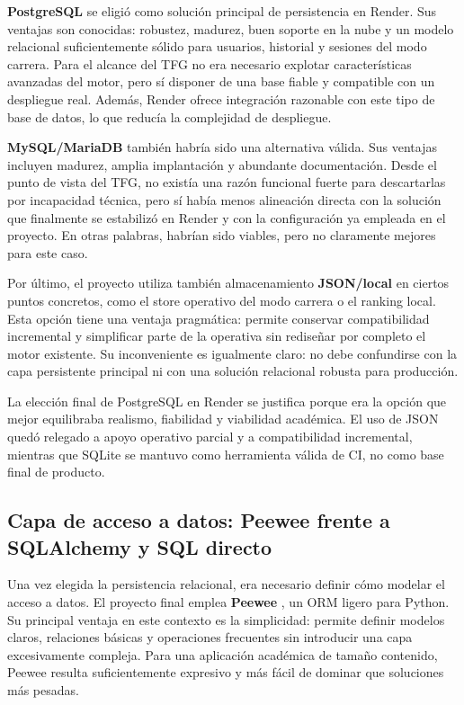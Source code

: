 \textbf{PostgreSQL} \cite{postgresql} se eligió como solución principal de persistencia en Render. Sus ventajas son conocidas: robustez, madurez, buen soporte en la nube y un modelo relacional suficientemente sólido para usuarios, historial y sesiones del modo carrera. Para el alcance del TFG no era necesario explotar características avanzadas del motor, pero sí disponer de una base fiable y compatible con un despliegue real. Además, Render ofrece integración razonable con este tipo de base de datos, lo que reducía la complejidad de despliegue.

\textbf{MySQL/MariaDB} \cite{mariadb} también habría sido una alternativa válida. Sus ventajas incluyen madurez, amplia implantación y abundante documentación. Desde el punto de vista del TFG, no existía una razón funcional fuerte para descartarlas por incapacidad técnica, pero sí había menos alineación directa con la solución que finalmente se estabilizó en Render y con la configuración ya empleada en el proyecto. En otras palabras, habrían sido viables, pero no claramente mejores para este caso.

Por último, el proyecto utiliza también almacenamiento \textbf{JSON/local} en ciertos puntos concretos, como el store operativo del modo carrera o el ranking local. Esta opción tiene una ventaja pragmática: permite conservar compatibilidad incremental y simplificar parte de la operativa sin rediseñar por completo el motor existente. Su inconveniente es igualmente claro: no debe confundirse con la capa persistente principal ni con una solución relacional robusta para producción.

La elección final de PostgreSQL en Render se justifica porque era la opción que mejor equilibraba realismo, fiabilidad y viabilidad académica. El uso de JSON quedó relegado a apoyo operativo parcial y a compatibilidad incremental, mientras que SQLite se mantuvo como herramienta válida de CI, no como base final de producto.

\subsection{Capa de acceso a datos: Peewee frente a SQLAlchemy y SQL directo}

Una vez elegida la persistencia relacional, era necesario definir cómo modelar el acceso a datos. El proyecto final emplea \textbf{Peewee} \cite{peewee}, un ORM ligero para Python. Su principal ventaja en este contexto es la simplicidad: permite definir modelos claros, relaciones básicas y operaciones frecuentes sin introducir una capa excesivamente compleja. Para una aplicación académica de tamaño contenido, Peewee resulta suficientemente expresivo y más fácil de dominar que soluciones más pesadas.

